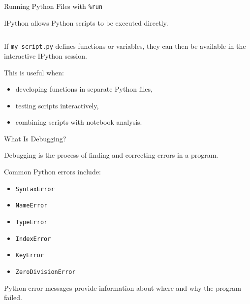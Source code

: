 \documentclass[aspectratio=43,10pt]{beamer}
\begin{document}
\begin{frame}[fragile]{Running Python Files with \texttt{\%run}}

IPython allows Python scripts to be executed directly.

\begin{lstlisting}[language=Python]
%run my_script.py
\end{lstlisting}

If \texttt{my\_script.py} defines functions or variables, they can then
be available in the interactive IPython session.

\vspace{0.3cm}

This is useful when:

\begin{itemize}
  \item developing functions in separate Python files,
  \item testing scripts interactively,
  \item combining scripts with notebook analysis.
\end{itemize}

\end{frame}

\begin{frame}{What Is Debugging?}

Debugging is the process of finding and correcting errors in a program.

\vspace{0.3cm}

Common Python errors include:

\begin{itemize}
  \item \texttt{SyntaxError}
  \item \texttt{NameError}
  \item \texttt{TypeError}
  \item \texttt{IndexError}
  \item \texttt{KeyError}
  \item \texttt{ZeroDivisionError}
\end{itemize}

\vspace{0.3cm}

Python error messages provide information about where and why the program failed.

\end{frame}
\end{document}
